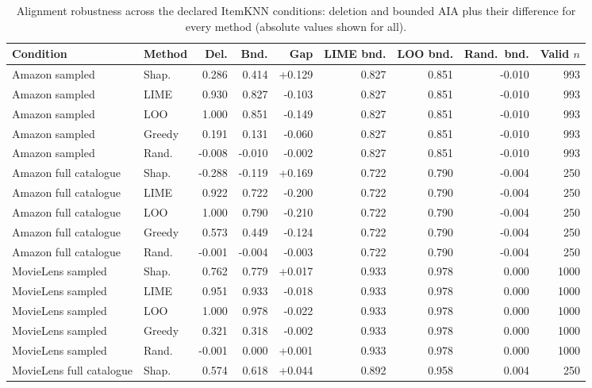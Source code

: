\begin{table}[!htbp]\centering\scriptsize\setlength{\tabcolsep}{2.5pt}
\caption{Alignment robustness across the declared ItemKNN conditions: deletion and
bounded AIA plus their difference for every method (absolute values shown for all).}
\label{tab:app-alignment}
\begin{tabular}{@{}llrrrrrrr@{}}
\toprule
Condition & Method & Del. & Bnd. & Gap & LIME bnd. & LOO bnd. & Rand.\ bnd. & Valid $n$ \\
\midrule
Amazon sampled & Shap. & 0.286 & 0.414 & +0.129 & 0.827 & 0.851 & -0.010 & 993 \\
Amazon sampled & LIME & 0.930 & 0.827 & -0.103 & 0.827 & 0.851 & -0.010 & 993 \\
Amazon sampled & LOO & 1.000 & 0.851 & -0.149 & 0.827 & 0.851 & -0.010 & 993 \\
Amazon sampled & Greedy & 0.191 & 0.131 & -0.060 & 0.827 & 0.851 & -0.010 & 993 \\
Amazon sampled & Rand. & -0.008 & -0.010 & -0.002 & 0.827 & 0.851 & -0.010 & 993 \\
Amazon full catalogue & Shap. & -0.288 & -0.119 & +0.169 & 0.722 & 0.790 & -0.004 & 250 \\
Amazon full catalogue & LIME & 0.922 & 0.722 & -0.200 & 0.722 & 0.790 & -0.004 & 250 \\
Amazon full catalogue & LOO & 1.000 & 0.790 & -0.210 & 0.722 & 0.790 & -0.004 & 250 \\
Amazon full catalogue & Greedy & 0.573 & 0.449 & -0.124 & 0.722 & 0.790 & -0.004 & 250 \\
Amazon full catalogue & Rand. & -0.001 & -0.004 & -0.003 & 0.722 & 0.790 & -0.004 & 250 \\
MovieLens sampled & Shap. & 0.762 & 0.779 & +0.017 & 0.933 & 0.978 & 0.000 & 1000 \\
MovieLens sampled & LIME & 0.951 & 0.933 & -0.018 & 0.933 & 0.978 & 0.000 & 1000 \\
MovieLens sampled & LOO & 1.000 & 0.978 & -0.022 & 0.933 & 0.978 & 0.000 & 1000 \\
MovieLens sampled & Greedy & 0.321 & 0.318 & -0.002 & 0.933 & 0.978 & 0.000 & 1000 \\
MovieLens sampled & Rand. & -0.001 & 0.000 & +0.001 & 0.933 & 0.978 & 0.000 & 1000 \\
MovieLens full catalogue & Shap. & 0.574 & 0.618 & +0.044 & 0.892 & 0.958 & 0.004 & 250 \\

\end{tabular}
\end{table}
